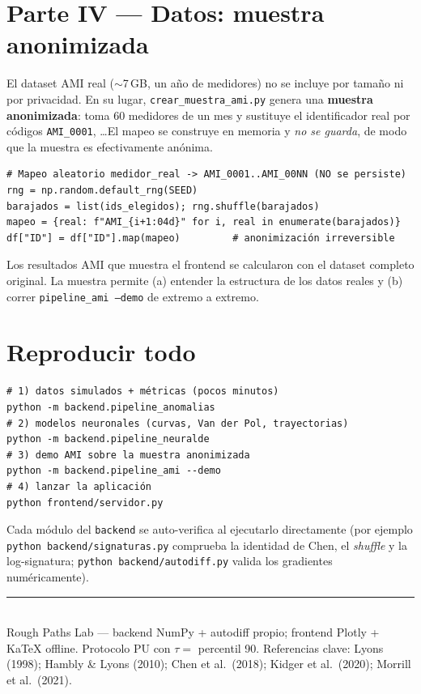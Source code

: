 \documentclass[11pt,a4paper]{article}
\begin{document}
\section{Parte IV — Datos: muestra anonimizada}

El dataset AMI real ($\sim$7\,GB, un año de medidores) no se incluye por tamaño
ni por privacidad. En su lugar, \texttt{crear\_muestra\_ami.py} genera una
\textbf{muestra anonimizada}: toma 60 medidores de un mes y sustituye el
identificador real por códigos \texttt{AMI\_0001}, \dots El mapeo se construye
en memoria y \emph{no se guarda}, de modo que la muestra es efectivamente
anónima.

\begin{lstlisting}
# Mapeo aleatorio medidor_real -> AMI_0001..AMI_00NN (NO se persiste)
rng = np.random.default_rng(SEED)
barajados = list(ids_elegidos); rng.shuffle(barajados)
mapeo = {real: f"AMI_{i+1:04d}" for i, real in enumerate(barajados)}
df["ID"] = df["ID"].map(mapeo)         # anonimización irreversible
\end{lstlisting}

\noindent Los resultados AMI que muestra el frontend se calcularon con el
dataset completo original. La muestra permite (a) entender la estructura de los
datos reales y (b) correr \texttt{pipeline\_ami --demo} de extremo a extremo.

\section{Reproducir todo}

\begin{lstlisting}[numbers=none]
# 1) datos simulados + métricas (pocos minutos)
python -m backend.pipeline_anomalias
# 2) modelos neuronales (curvas, Van der Pol, trayectorias)
python -m backend.pipeline_neuralde
# 3) demo AMI sobre la muestra anonimizada
python -m backend.pipeline_ami --demo
# 4) lanzar la aplicación
python frontend/servidor.py
\end{lstlisting}

\noindent Cada módulo del \texttt{backend} se auto-verifica al ejecutarlo
directamente (por ejemplo \texttt{python backend/signaturas.py} comprueba la
identidad de Chen, el \emph{shuffle} y la log-signatura;
\texttt{python backend/autodiff.py} valida los gradientes numéricamente).

\vfill
\noindent\rule{\linewidth}{0.4pt}\\[2pt]
{\footnotesize Rough Paths Lab — backend NumPy + autodiff propio; frontend
Plotly + KaTeX offline. Protocolo PU con $\tau=$ percentil 90. Referencias
clave: Lyons (1998); Hambly \& Lyons (2010); Chen et al.\ (2018); Kidger et
al.\ (2020); Morrill et al.\ (2021).}
\end{document}
